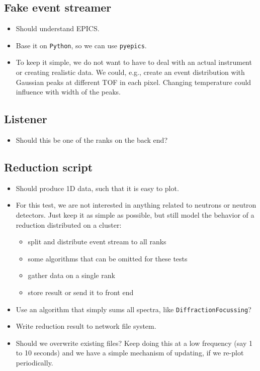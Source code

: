 \documentclass[a4paper,english,numbers=noenddot,bibliography=totoc,chapterprefix=on,DIV=12]{scrartcl}
\newcommand{\tof}{TOF\xspace}
\newcommand{\epics}{EPICS\xspace}
\newcommand{\python}{\texttt{Python}\xspace}
\begin{document}
\subsection{Fake event streamer}

\begin{itemize}
  \item Should understand \epics.
  \item Base it on \python, so we can use \texttt{pyepics}.
  \item To keep it simple, we do not want to have to deal with an actual instrument or creating realistic data.
    We could, e.g., create an event distribution with Gaussian peaks at different \tof in each pixel.
    Changing temperature could influence with width of the peaks.
\end{itemize}

\subsection{Listener}

\begin{itemize}
  \item Should this be one of the ranks on the back end?
\end{itemize}

\subsection{Reduction script}

\begin{itemize}
  \item Should produce 1D data, such that it is easy to plot.
  \item For this test, we are not interested in anything related to neutrons or neutron detectors.
    Just keep it as simple as possible, but still model the behavior of a reduction distributed on a cluster:
    \begin{itemize}
      \item split and distribute event stream to all ranks
      \item some algorithms that can be omitted for these tests
      \item gather data on a single rank
      \item store result or send it to front end
    \end{itemize}
  \item Use an algorithm that simply sums all spectra, like \texttt{DiffractionFocussing}?
  \item Write reduction result to network file system.
  \item Should we overwrite existing files?
    Keep doing this at a low frequency (say 1 to 10 seconds) and we have a simple mechanism of updating, if we re-plot periodically.
\end{itemize}
\end{document}
